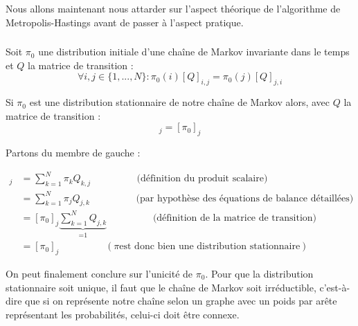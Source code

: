 Nous allons maintenant nous attarder sur l'aspect théorique de l'algorithme de 
Metropolis-Hastings avant de passer à l'aspect pratique.

\subsubsection{}
Soit $\pi_0$ une distribution initiale d'une chaîne de Markov invariante dans le temps et $Q$ la
matrice de transition :
\begin{equation*}
  \forall i,j \in \{1,...,N\} : \pi_0(i)[Q]_{i,j} = \pi_0(j)[Q]_{j,i}
\end{equation*}

Si $\pi_0$ est une distribution stationnaire de notre chaîne de Markov alors, avec $Q$ la matrice de
transition :
\begin{equation}
  [\pi_0 Q]_j = [\pi_0]_j
\end{equation}

Partons du membre de gauche :

\begin{align*}
  [\pi_0 Q]_j &= \sum_{k = 1}^N \pi_k Q_{k,j} \hspace{2cm} \text{(définition du produit scalaire)}\\
              &= \sum_{k = 1}^N \pi_j Q_{j,k} \hspace{2cm} \text{(par hypothèse des équations de balance détaillées)}\\
              &= [\pi_0]_j \underbrace{\sum_{k=1}^N Q_{j,k}}_\textrm{=1} \hspace{2cm} \text{(définition de la matrice de transition)}\\
              &= [\pi_0]_j \hspace{2cm} (\pi \text{est donc bien une distribution stationnaire})
\end{align*}

On peut finalement conclure sur l'unicité de $\pi_0$. Pour que la distribution stationnaire soit unique, il faut que le chaîne de Markov soit irréductible, c'est-à-dire que 
si on représente notre chaîne selon un graphe avec un poids par arête représentant les probabilités, celui-ci doit être connexe.

\subsubsection{}